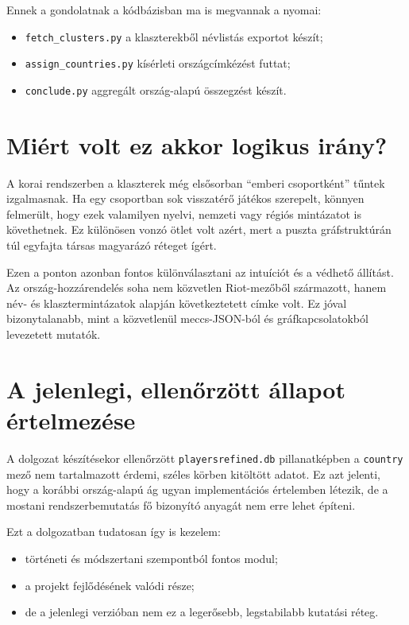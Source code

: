 ﻿\documentclass[a4paper,12pt]{report}
\begin{document}
Ennek a gondolatnak a kódbázisban ma is megvannak a nyomai:

\begin{itemize}
    \item \texttt{fetch\_clusters.py} a klaszterekből névlistás exportot készít;
    \item \texttt{assign\_countries.py} kísérleti országcímkézést futtat;
    \item \texttt{conclude.py} aggregált ország-alapú összegzést készít.
\end{itemize}

\section{Miért volt ez akkor logikus irány?}

A korai rendszerben a klaszterek még elsősorban ``emberi csoportként'' tűntek izgalmasnak. Ha egy csoportban sok visszatérő játékos szerepelt, könnyen felmerült, hogy ezek valamilyen nyelvi, nemzeti vagy régiós mintázatot is követhetnek. Ez különösen vonzó ötlet volt azért, mert a puszta gráfstruktúrán túl egyfajta társas magyarázó réteget ígért.

Ezen a ponton azonban fontos különválasztani az intuíciót és a védhető állítást. Az ország-hozzárendelés soha nem közvetlen Riot-mezőből származott, hanem név- és klasztermintázatok alapján következtetett címke volt. Ez jóval bizonytalanabb, mint a közvetlenül meccs-JSON-ból és gráfkapcsolatokból levezetett mutatók.

\section{A jelenlegi, ellenőrzött állapot értelmezése}

A dolgozat készítésekor ellenőrzött \texttt{playersrefined.db} pillanatképben a \texttt{country} mező nem tartalmazott érdemi, széles körben kitöltött adatot. Ez azt jelenti, hogy a korábbi ország-alapú ág ugyan implementációs értelemben létezik, de a mostani rendszerbemutatás fő bizonyító anyagát nem erre lehet építeni.

Ezt a dolgozatban tudatosan így is kezelem:

\begin{itemize}
    \item történeti és módszertani szempontból fontos modul;
    \item a projekt fejlődésének valódi része;
    \item de a jelenlegi verzióban nem ez a legerősebb, legstabilabb kutatási réteg.
\end{itemize}
\end{document}
